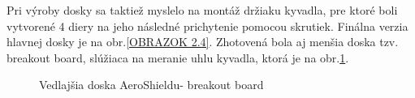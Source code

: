 Pri výroby dosky sa taktiež myslelo na montáž držiaku kyvadla, pre ktoré boli vytvorené 4 diery na jeho následné prichytenie pomocou skrutiek. Finálna verzia hlavnej dosky je na obr.\ref{OBRAZOK 2.4}. Zhotovená bola aj menšia doska tzv. breakout board, slúžiaca na meranie uhlu kyvadla, ktorá je na obr.\ref{OBRAZOK 2.6}.

\begin{figure}[!tbh]
\hfill
{}
\hfill
{}
\hfill
\caption{Vedlajšia doska AeroShieldu- breakout board}\label{OBRAZOK 2.6}
\end{figure}


